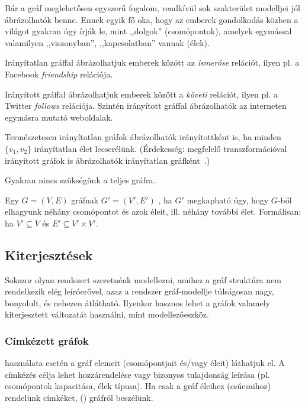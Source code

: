 Bár a gráf meglehetősen egyszerű fogalom, rendkívül sok szakterület modelljei jól ábrázolhatók benne. Ennek egyik fő oka, hogy az emberek gondolkodás közben a világot gyakran úgy írják le, mint ,,dolgok'' (csomópontok), amelyek egymással valamilyen ,,viszonyban'', ,,kapcsolatban'' vannak (élek).

\begin{pelda}
Irányítatlan gráffal ábrázolhatjuk emberek között az \emph{ismerőse} relációt, ilyen pl. a Facebook \emph{friendship} relációja.
\end{pelda}

\begin{pelda}
Irányított gráffal ábrázolhatjuk emberek között a \emph{követi} relációt, ilyen pl. a Twitter \emph{follows} relációja. Szintén irányított gráffal ábrázolhatók az interneten egymásra mutató weboldalak.
\end{pelda}

Természetesen irányítatlan gráfok ábrázolhatók irányítottként is, ha minden $\{v_1, v_2\}$ irányítatlan élet lecserélünk. (Érdekesség: megfelelő transzformációval irányított gráfok is ábrázolhatók irányítatlan gráfként~\cite{rodriguez2008mapping}.)

Gyakran nincs szükségünk a teljes gráfra.

\begin{definicio}
Egy $G = (V, E)$ gráfnak $G' = (V', E')$ , ha $G'$ megkapható úgy, hogy $G$-ből elhagyunk néhány csomópontot és azok éleit, ill. néhány további élet. Formálisan: ha $V' \subseteq V$ és $E' \subseteq V' \times V'$.
\end{definicio}	

\subsection{Kiterjesztések}

Sokszor olyan rendszert szeretnénk modellezni, amihez a gráf struktúra nem rendelkezik elég leíróerővel, azaz a rendszer gráf-modellje túlságosan nagy, bonyolult, és nehezen átlátható. Ilyenkor hasznos lehet a gráfok valamely kiterjesztett változatát használni, mint modellezőeszköz.

\subsubsection{Címkézett gráfok}

 használata esetén a gráf elemeit (csomópontjait és/vagy éleit)  láthatjuk el. A címkézés célja lehet  hozzárendelése vagy bizonyos tulajdonság leírása (pl. csomópontok kapacitása, élek típusa).
Ha csak a gráf éleihez (csúcsaihoz) rendelünk címkéket,  () gráfról beszélünk.

